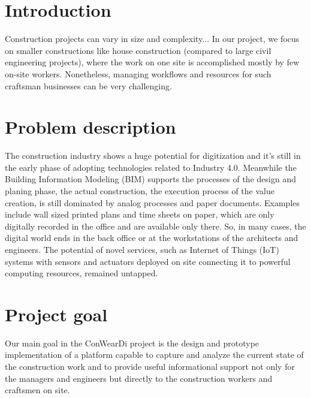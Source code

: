 \section{Introduction}


Construction projects can vary in size and complexity...
In our project, we focus on smaller constructions like house construction (compared to large civil engineering projects), where the work on one site is accomplished mostly by few on-site workers. Nonetheless, managing workflows and resources for such craftsman businesses can be very challenging.

\section{Problem description}
The construction industry shows a huge potential for digitization and it's still in the early phase of adopting technologies related to Industry 4.0. 
Meanwhile the Building Information Modeling (BIM) supports the processes of the design and planing phase, the actual construction, the execution process of the value creation, is still dominated by analog processes and paper documents. 
Examples include wall sized printed plans and time sheets on paper, which are only digitally recorded in the office and are available only there. 
So, in many cases, the digital world ends in the back office or at the workstations of the architects and engineers. 
The potential of novel services, such as Internet of Things (IoT) systems with sensors and actuators deployed on site connecting it to powerful computing resources, remained untapped.

\section{Project goal}
Our main goal in the ConWearDi project is the design and prototype implementation of a platform capable to capture and analyze the current state of the construction work and to provide useful informational support not only for the managers and engineers but directly to the construction workers and craftsmen on site. 


